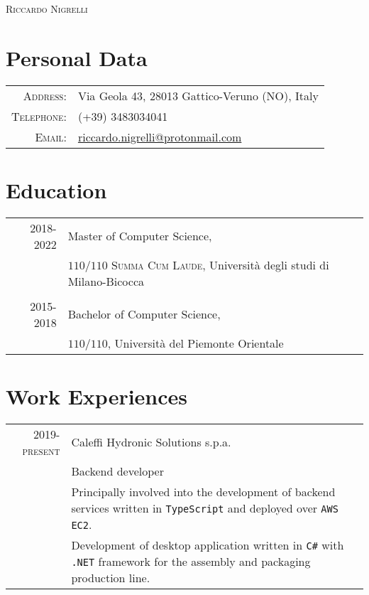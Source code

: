 \documentclass[a4paper, 12pt]{article}
\begin{document}
  \thispagestyle{empty}

  \begin{center}
    \Huge\textsc{Riccardo Nigrelli}
  \end{center}

  \bigskip
  \section{Personal Data}
    \bigskip
    \begin{tabular}{rl}
      \textsc{Address:}   & Via Geola 43, 28013 Gattico-Veruno (NO), Italy\\
      \textsc{Telephone:} & (+39) 3483034041\\
      \textsc{Email:}     & \href{mailto:riccardo.nigrelli@protonmail.com}{riccardo.nigrelli@protonmail.com}
    \end{tabular}
  
  \bigskip
  \section{Education}
    \bigskip
    \begin{tabular}{rl}
      \textsc{2018-2022} & Master of Computer Science, \\ & $110/110$ \textsc{\footnotesize{Summa Cum Laude}}, Università degli studi di Milano-Bicocca \\ \\
      \textsc{2015-2018} & Bachelor of Computer Science, \\ & $110/110$, Università del Piemonte Orientale \\
    \end{tabular}

  \bigskip
  \section{Work Experiences}
    \begin{tabular}{r|p{12cm}}
      \textsc{2019-present} & Caleffi Hydronic Solutions s.p.a. \\ &
      \footnotesize{Backend developer} \\ &
      Principally involved into the development of backend services written in 
      \verb!TypeScript! and deployed over \verb!AWS EC2!. \\ &
      Development of desktop application written in \verb!C#! with \verb!.NET!
      framework for the assembly and packaging production line.
    \end{tabular}
\end{document}
